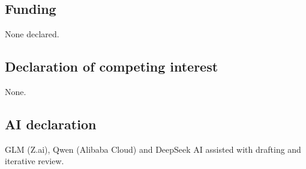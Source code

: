 \documentclass[11pt]{article}
\begin{document}
\subsection*{Funding}

None declared.

\subsection*{Declaration of competing interest}

None.

\subsection*{AI declaration}
GLM (Z.ai), Qwen (Alibaba Cloud) and DeepSeek AI assisted with drafting and iterative review.
\end{document}
